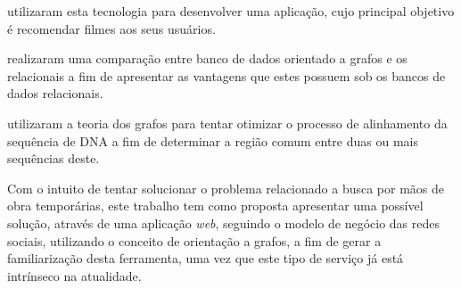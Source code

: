 \par {} utilizaram esta tecnologia para desenvolver uma aplicação, cujo principal objetivo é recomendar filmes aos seus usuários.

\par {} realizaram uma comparação entre banco de dados orientado a grafos e os relacionais a fim de apresentar as vantagens que estes possuem sob os bancos de dados relacionais.

\par {} utilizaram a teoria dos grafos para tentar otimizar o processo de alinhamento da sequência de DNA a fim de determinar a região comum entre duas ou mais sequências deste.

\par Com o intuito de tentar solucionar o problema relacionado a busca por mãos de obra temporárias, este trabalho tem como proposta apresentar uma possível solução, através de uma aplicação \textit{web}, seguindo o modelo de negócio das redes sociais, utilizando o conceito de orientação a grafos, a fim de gerar a familiarização desta ferramenta, uma vez que este tipo de serviço já está intrínseco na atualidade.
